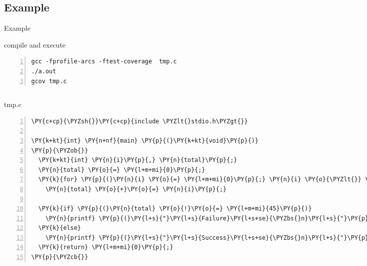 \documentclass{beamer}
\begin{document}

\subsection{Example}

\begin{frame}[fragile]{Example}

\begin{exampleblock}{compile and execute}
\tiny
\begin{Verbatim}[numbers=left,firstnumber=1,stepnumber=1]
gcc -fprofile-arcs -ftest-coverage  tmp.c
./a.out
gcov tmp.c
\end{Verbatim}
\end{exampleblock}

\begin{columns}[t]
 
\column{1.5in}

\begin{exampleblock}{tmp.c}
\tiny
\begin{Verbatim}[commandchars=\\\{\},numbers=left,firstnumber=1,stepnumber=1]
\PY{c+cp}{\PYZsh{}}\PY{c+cp}{include \PYZlt{}stdio.h\PYZgt{}}

\PY{k+kt}{int} \PY{n+nf}{main} \PY{p}{(}\PY{k+kt}{void}\PY{p}{)}
\PY{p}{\PYZob{}}
  \PY{k+kt}{int} \PY{n}{i}\PY{p}{,} \PY{n}{total}\PY{p}{;}
  \PY{n}{total} \PY{o}{=} \PY{l+m+mi}{0}\PY{p}{;}
  \PY{k}{for} \PY{p}{(}\PY{n}{i} \PY{o}{=} \PY{l+m+mi}{0}\PY{p}{;} \PY{n}{i} \PY{o}{\PYZlt{}} \PY{l+m+mi}{10}\PY{p}{;} \PY{n}{i}\PY{o}{+}\PY{o}{+}\PY{p}{)}
    \PY{n}{total} \PY{o}{+}\PY{o}{=} \PY{n}{i}\PY{p}{;}

  \PY{k}{if} \PY{p}{(}\PY{n}{total} \PY{o}{!}\PY{o}{=} \PY{l+m+mi}{45}\PY{p}{)}
    \PY{n}{printf} \PY{p}{(}\PY{l+s}{"}\PY{l+s}{Failure}\PY{l+s+se}{\PYZbs{}n}\PY{l+s}{"}\PY{p}{)}\PY{p}{;}
  \PY{k}{else}
    \PY{n}{printf} \PY{p}{(}\PY{l+s}{"}\PY{l+s}{Success}\PY{l+s+se}{\PYZbs{}n}\PY{l+s}{"}\PY{p}{)}\PY{p}{;}
  \PY{k}{return} \PY{l+m+mi}{0}\PY{p}{;}
\PY{p}{\PYZcb{}}
\end{Verbatim}
\end{exampleblock}

\column{2in}

\begin{exampleblock}{gcov output}
\tiny
\begin{Verbatim}[numbers=left,firstnumber=1,stepnumber=1]
    -:    1:#include <stdio.h>
    -:    2:
    1:    3:int main (void)
    -:    4:{
    -:    5:  int i, total;
    1:    6:  total = 0;
   11:    7:  for (i = 0; i < 10; i++)
   10:    8:    total += i;
    -:    9:
    1:   10:  if (total != 45)
#####:   11:    printf ("Failure\n");
    -:   12:  else
    1:   13:    printf ("Success\n");
    1:   14:  return 0;
    -:   15:}
\end{Verbatim}
\end{exampleblock}

\end{columns}

\end{frame}
\end{document}
